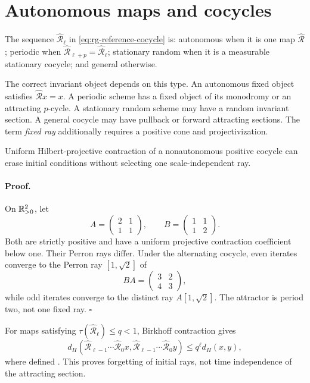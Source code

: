\section{Autonomous maps and cocycles}
\label{sec:rg-dynamical-types}

The sequence \(\widehat{\mathcal R}_\ell\) in
\eqref{eq:rg-reference-cocycle} is:
autonomous when it is one map \(\widehat{\mathcal R}\);
periodic when
\(\widehat{\mathcal R}_{\ell+p}=\widehat{\mathcal R}_\ell\);
stationary random when it is a measurable stationary cocycle; and general
otherwise. 

The correct invariant object depends on this type. An autonomous fixed object
satisfies \(\widehat{\mathcal R}x=x\). A periodic scheme has a fixed object
of its monodromy or an attracting \(p\)-cycle. A stationary random scheme may
have a random invariant section. A general cocycle may have pullback or
forward attracting sections. The term \emph{fixed ray} additionally requires
a positive cone and projectivization. 

Uniform Hilbert-projective contraction of a nonautonomous positive cocycle can
erase initial conditions without selecting one scale-independent ray.

\paragraph{Proof.}
On \(\mathbb R^2_{>0}\), let
\[
A=\begin{pmatrix}2&1\\1&1\end{pmatrix},
\qquad
B=\begin{pmatrix}1&1\\1&2\end{pmatrix}.
\]
Both are strictly positive and have a uniform projective contraction
coefficient below one. Their Perron rays differ. Under the alternating
cocycle, even iterates converge to the Perron ray
\([1,\sqrt2]\) of
\[
BA=\begin{pmatrix}3&2\\4&3\end{pmatrix},
\]
while odd iterates converge to the distinct ray
\(A[1,\sqrt2]\). The attractor is period two, not one fixed ray. \(\square\)

For maps satisfying
\(\tau(\widehat{\mathcal R}_\ell)\leq q<1\), Birkhoff contraction gives
\begin{equation}
d_H(
\widehat{\mathcal R}_{\ell-1}\cdots\widehat{\mathcal R}_0x,
\widehat{\mathcal R}_{\ell-1}\cdots\widehat{\mathcal R}_0y)
\leq q^\ell d_H(x,y),
\label{eq:rg-cocycle-contraction}
\end{equation}
where defined \citep{Birkhoff1957,nussbaum1988hilbert}. This proves forgetting
of initial rays, not time independence of the attracting section.


